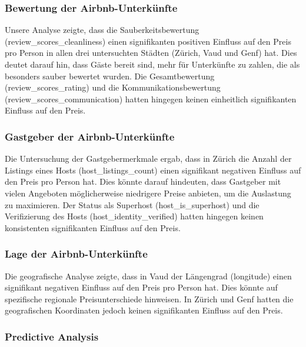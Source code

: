\documentclass[
  journal,
]{IEEEtran}%
\begin{document}
\hypertarget{bewertung-der-airbnb-unterkuxfcnfte-1}{%
\subsubsection{Bewertung der
Airbnb-Unterkünfte}\label{bewertung-der-airbnb-unterkuxfcnfte-1}}

Unsere Analyse zeigte, dass die Sauberkeitsbewertung
(review\_scores\_cleanliness) einen signifikanten positiven Einfluss auf
den Preis pro Person in allen drei untersuchten Städten (Zürich, Vaud
und Genf) hat. Dies deutet darauf hin, dass Gäste bereit sind, mehr für
Unterkünfte zu zahlen, die als besonders sauber bewertet wurden. Die
Gesamtbewertung (review\_scores\_rating) und die Kommunikationsbewertung
(review\_scores\_communication) hatten hingegen keinen einheitlich
signifikanten Einfluss auf den Preis.

\hypertarget{gastgeber-der-airbnb-unterkuxfcnfte}{%
\subsubsection{Gastgeber der
Airbnb-Unterkünfte}\label{gastgeber-der-airbnb-unterkuxfcnfte}}

Die Untersuchung der Gastgebermerkmale ergab, dass in Zürich die Anzahl
der Listings eines Hosts (host\_listings\_count) einen signifikant
negativen Einfluss auf den Preis pro Person hat. Dies könnte darauf
hindeuten, dass Gastgeber mit vielen Angeboten möglicherweise niedrigere
Preise anbieten, um die Auslastung zu maximieren. Der Status als
Superhost (host\_is\_superhost) und die Verifizierung des Hosts
(host\_identity\_verified) hatten hingegen keinen konsistenten
signifikanten Einfluss auf den Preis.

\hypertarget{lage-der-airbnb-unterkuxfcnfte}{%
\subsubsection{Lage der
Airbnb-Unterkünfte}\label{lage-der-airbnb-unterkuxfcnfte}}

Die geografische Analyse zeigte, dass in Vaud der Längengrad (longitude)
einen signifikant negativen Einfluss auf den Preis pro Person hat. Dies
könnte auf spezifische regionale Preisunterschiede hinweisen. In Zürich
und Genf hatten die geografischen Koordinaten jedoch keinen
signifikanten Einfluss auf den Preis.

\hypertarget{predictive-analysis-2}{%
\subsubsection{Predictive Analysis}\label{predictive-analysis-2}}
\end{document}
